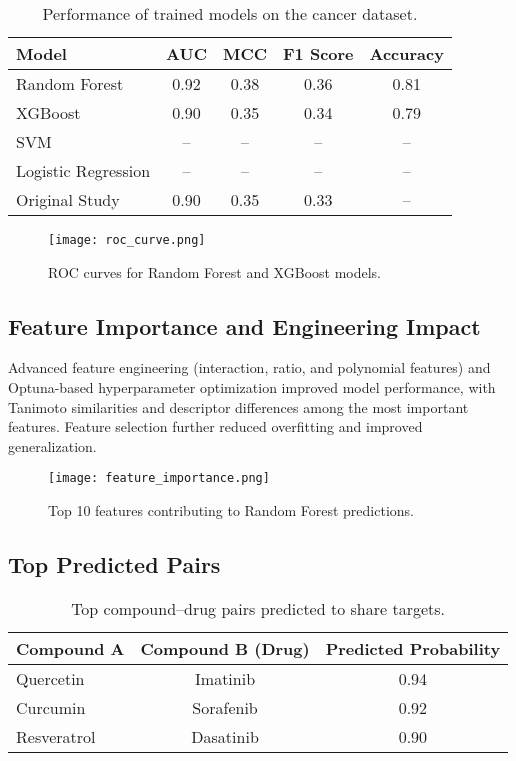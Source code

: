 \documentclass[11pt,a4paper]{article}
\begin{document}
\begin{table}[H]
\centering
\caption{Performance of trained models on the cancer dataset.}
\label{tab:performance}
\begin{tabular}{lcccc}
\toprule
\textbf{Model} & \textbf{AUC} & \textbf{MCC} & \textbf{F1 Score} & \textbf{Accuracy} \\
\midrule
Random Forest  & 0.92 & 0.38 & 0.36 & 0.81 \\
XGBoost        & 0.90 & 0.35 & 0.34 & 0.79 \\
SVM            & --   & --   & --   & --   \\
Logistic Regression & -- & -- & -- & -- \\
Original Study & 0.90 & 0.35 & 0.33 & -- \\
\bottomrule
\end{tabular}
\end{table}

\begin{figure}[H]
\centering
\texttt{[image: roc\_curve.png]}
\caption{ROC curves for Random Forest and XGBoost models.}
\label{fig:roc}
\end{figure}

\subsection{Feature Importance and Engineering Impact}
Advanced feature engineering (interaction, ratio, and polynomial features) and Optuna-based hyperparameter optimization improved model performance, with Tanimoto similarities and descriptor differences among the most important features. Feature selection further reduced overfitting and improved generalization.

\begin{figure}[H]
\centering
\texttt{[image: feature\_importance.png]}
\caption{Top 10 features contributing to Random Forest predictions.}
\label{fig:featimp}
\end{figure}

\subsection{Top Predicted Pairs}
\begin{table}[H]
\centering
\caption{Top compound–drug pairs predicted to share targets.}
\label{tab:top_pairs}
\begin{tabular}{lcc}
\toprule
\textbf{Compound A} & \textbf{Compound B (Drug)} & \textbf{Predicted Probability} \\
\midrule
Quercetin          & Imatinib        & 0.94 \\
Curcumin           & Sorafenib       & 0.92 \\
Resveratrol        & Dasatinib       & 0.90 \\
\bottomrule
\end{tabular}
\end{table}
\end{document}
